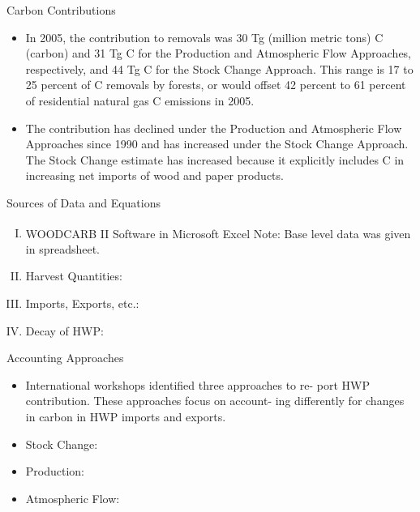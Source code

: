 \documentclass[final]{beamer}\usepackage[]{graphicx}\usepackage[]{color}
\newlength{\onecolwid}
\begin{document}
\begin{frame}[t]
\begin{columns}[t]
\begin{column}{\onecolwid}
\begin{block}{Carbon Contributions}
\begin{itemize}
\item In 2005, the contribution to removals was 30 Tg (million metric tons) C (carbon) and 31 Tg C for the Production and Atmospheric Flow Approaches, respectively, and 44 Tg C for the Stock Change Approach. This range is 17 to 25 percent of C removals by forests, or would offset 42 percent to 61 percent of residential natural gas C emissions in 2005. 
\vspace{1ex}
\item The contribution has declined under the Production and Atmospheric Flow Approaches since 1990 and has increased under the Stock Change Approach. The Stock Change estimate has increased because it explicitly includes C in increasing net imports of wood and paper products. 
\vspace{1ex}
\end{itemize}
\vspace{0ex}
\vfill
\end{block}


\begin{block}{Sources of Data and Equations}

\begin{enumerate}[I.]
\item WOODCARB II Software in Microsoft Excel\textsuperscript{\textregistered}
\vspace{0ex}
Note: Base level data was given in spreadsheet. 
\item Harvest Quantities:
\item Imports, Exports, etc.:
\item Decay of HWP:
\end{enumerate}
\vspace{0ex}

\end{block}
\vfill


\begin{block}{Accounting Approaches}

\begin{itemize}
\item International workshops identified three approaches to re- port HWP contribution. These approaches focus on account- ing differently for changes in carbon in HWP imports and exports.
\item Stock Change:
\item Production:
\item Atmospheric Flow:
\end{itemize}



\end{block}
\end{column}
\end{columns}
\end{frame}
\end{document}

